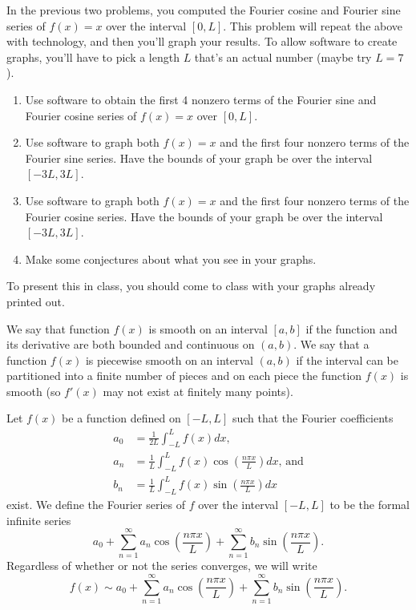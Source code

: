 \begin{problem}
 In the previous two problems, you computed the Fourier cosine and Fourier sine series of $f(x)=x$ over the interval $[0,L]$. This problem will repeat the above with technology, and then you'll graph your results. To allow software to create graphs, you'll have to pick a length $L$ that's an actual number (maybe try $L=7$).  
\begin{enumerate}
 \item Use software to obtain the first 4 nonzero terms of the Fourier sine and Fourier cosine series of $f(x)=x$ over $[0,L]$.
 \item Use software to graph both $f(x)=x$ and the first four nonzero terms of the Fourier sine series. 
Have the bounds of your graph be  over the interval $[-3L, 3L]$. 
 \item Use software to graph both $f(x)=x$ and the first four nonzero terms of the Fourier cosine series.
Have the bounds of your graph be  over the interval $[-3L, 3L]$. 
 \item Make some conjectures about what you see in your graphs.
\end{enumerate}
To present this in class, you should come to class with your graphs already printed out.
\end{problem}














\begin{definition}
 We say that  function $f(x)$ is smooth on an interval $[a,b]$ if the function and its derivative are both bounded and continuous on $(a,b)$.  We say that a function $f(x)$ is piecewise smooth on an interval $(a,b)$ if the interval can be partitioned into a finite number of pieces and on each piece the function $f(x)$ is smooth (so $f'(x)$ may not exist at finitely many points).  
\end{definition}


\begin{definition}
 Let $f(x)$ be a function defined on $[-L,L]$ such that the Fourier coefficients
\begin{align*}
a_0&=\frac{1}{2L}\int_{-L}^L f(x)dx,\\
a_n&=\frac{1}{L}\int_{-L}^L f(x)\cos\left(\frac{n\pi x}{L}\right)dx \text{, and}\\
b_n&=\frac{1}{L}\int_{-L}^L f(x)\sin\left(\frac{n\pi x}{L}\right)dx 
\end{align*}
exist. We define the Fourier series of $f$ over the interval $[-L,L]$ to be the formal infinite series
$$a_0+\sum_{n=1}^\infty a_n \cos\left(\frac{n\pi x}{L}\right) +\sum_{n=1}^\infty b_n \sin\left(\frac{n\pi x}{L}\right).$$
Regardless of whether or not the series converges, we will write
$$f(x)\sim a_0+\sum_{n=1}^\infty a_n \cos\left(\frac{n\pi x}{L}\right) +\sum_{n=1}^\infty b_n \sin\left(\frac{n\pi x}{L}\right).$$
\end{definition}

